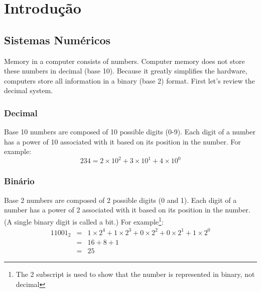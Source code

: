 \chapter{Introdu\c{c}\~ao}
\section{Sistemas Numéricos}

Memory in a computer consists of numbers. Computer memory does not
store these numbers in decimal (base 10). Because it greatly
simplifies the hardware, computers store all information in a binary
(base 2) format. First let's review the decimal system.

\subsection{Decimal}

Base 10 numbers are composed of 10 possible digits (0-9). Each digit
of a number has a power of 10 associated with it based on its position
in the number. For example:
\begin{displaymath}
234 = 2 \times 10^2 + 3 \times 10^1 + 4 \times 10^0
\end{displaymath}

\subsection{Binário}

Base 2 numbers are composed of 2 possible digits (0 and 1). Each digit
of a number has a power of 2 associated with it based on its position
in the number. (A single binary digit is called a bit.) For
example\footnote{The 2 subscript is used to show that the number is
represented in binary, not decimal}:
\begin{eqnarray*}
11001_2 & = & 1 \times 2^4 + 1 \times 2^3 + 0 \times 2^2 + 0 \times 2^1
              + 1 \times 2^0 \\
 & = & 16 + 8 + 1 \\
 & = & 25
\end{eqnarray*}

